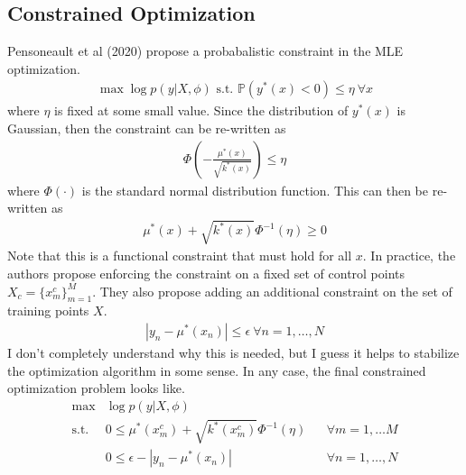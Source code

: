 \documentclass[12pt]{article}
\newcommand*{\abs}[1]{\left\lvert#1\right\rvert}
\newcommand{\Prob}{\mathbb{P}}
\begin{document}
\subsection{Constrained Optimization}
Pensoneault et al (2020) propose a probabalistic constraint in the MLE optimization. 
\begin{align*}
\max \log p(y|X, \phi) \text{ s.t. } \Prob(y^*(x) < 0) \leq \eta \ \forall x
\end{align*}
where $\eta$ is fixed at some small value. Since the distribution of $y^*(x)$ is Gaussian, then the constraint can be re-written as 
\begin{align*}
\Phi\left(-\frac{\mu^*(x)}{\sqrt{k^*(x)}} \right) \leq \eta
\end{align*}
where $\Phi(\cdot)$ is the standard normal distribution function. This can then be re-written as 
\begin{align*}
\mu^*(x) + \sqrt{k^*(x)} \Phi^{-1}(\eta) \geq 0
\end{align*}
Note that this is a functional constraint that must hold for all $x$. In practice, the authors propose enforcing the constraint on a fixed set of 
control points $X_c = \{x^c_m\}_{m = 1}^{M}$. They also propose adding an additional constraint on the set of training points $X$. 
\begin{align*}
\abs{y_n - \mu^*(x_n)} \leq \epsilon \ \forall n = 1, \dots, N
\end{align*}
I don't completely understand why this is needed, but I guess it helps to stabilize the optimization algorithm in some sense. In any case, the final 
constrained optimization problem looks like. 
\begin{align*}
\max &\log p(y|X, \phi) \\
\text{s.t. } &0 \leq \mu^*(x^c_m) + \sqrt{k^*(x^c_m)} \Phi^{-1}(\eta) &&\forall m = 1, \dots M \\
&0 \leq \epsilon - \abs{y_n - \mu^*(x_n)} &&\forall n = 1, \dots, N
\end{align*}
\end{document}
